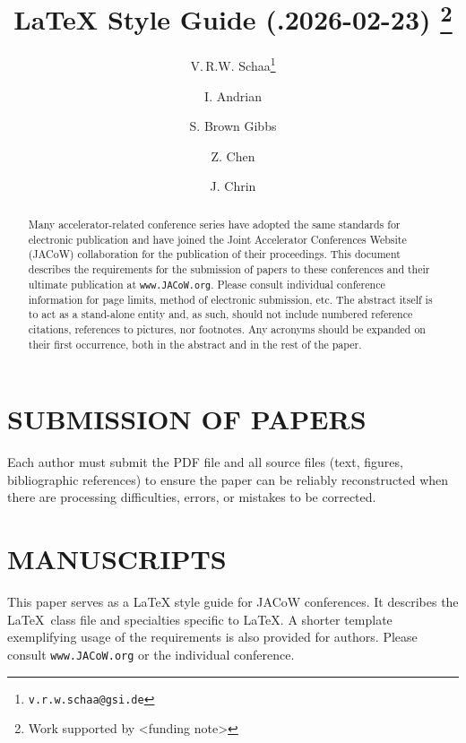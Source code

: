 \documentclass[%
               hyphens,       %
               ]{jacow}
\begin{document}
\title{ {\LaTeX} Style Guide (.2026-02-23)%
		\thanks{Work supported by <funding note>}
		}

		\author[1]{V.\,R.W. Schaa\thanks{\texttt{v.r.w.schaa@gsi.de}}}
		\author[2]{I. Andrian}
		\author[3]{S. Brown Gibbs}
		\author[4]{Z. Chen}
		\author[5]{J. Chrin}

\maketitle


\begin{abstract}
	Many accelerator-related conference series have adopted the same standards 
	for electronic publication and have joined the Joint Accelerator Conferences Website (JACoW) collaboration 
	for the publication of their proceedings. This document describes the requirements 
	for the submission of papers to these conferences and their ultimate publication 
	at \texttt{www.JACoW.org}. 
	Please consult individual conference information for page limits, 
	method of electronic submission, etc. The abstract itself is to act 
	as a stand-alone entity and, as such, should not include numbered reference citations,
	references to pictures, nor footnotes.
	Any acronyms should be expanded on their first occurrence, 
	both in the abstract and in the rest of the paper.
\end{abstract}

\section{SUBMISSION OF PAPERS}

Each author must submit the PDF file and all source files (text, figures, 
bibliographic references) to ensure the paper can be reliably reconstructed 
when there are processing difficulties, errors, or mistakes to be corrected.

\section{MANUSCRIPTS}

This paper serves as a {\LaTeX} style guide for JACoW conferences.
It describes the \LaTeX\ class file and specialties specific to \LaTeX.
A shorter template exemplifying usage of the requirements is also provided for authors.
Please consult \texttt{www.JACoW.org} or the individual conference.
\end{document}
